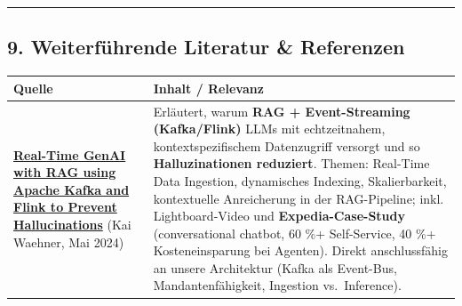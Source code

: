 \begin{center}\rule{0.5\linewidth}{0.5pt}\end{center}

\subsection{9. Weiterführende Literatur \&
Referenzen}\label{weiterfuxfchrende-literatur-referenzen}

{\def\LTcaptype{none} %
\begin{longtable}[]{@{}
  >{\raggedright\arraybackslash}p{}
  >{\raggedright\arraybackslash}p{}@{}}
\toprule\noalign{}
\begin{minipage}[b]{\linewidth}\raggedright
Quelle
\end{minipage} & \begin{minipage}[b]{\linewidth}\raggedright
Inhalt / Relevanz
\end{minipage} \\
\midrule\noalign{}
\endhead
\bottomrule\noalign{}
\endlastfoot
\textbf{\href{https://www.kai-waehner.de/blog/2024/05/30/real-time-genai-with-rag-using-apache-kafka-and-flink-to-prevent-hallucinations/}{Real-Time
GenAI with RAG using Apache Kafka and Flink to Prevent Hallucinations}}
(Kai Waehner, Mai 2024) & Erläutert, warum \textbf{RAG + Event-Streaming
(Kafka/Flink)} LLMs mit echtzeitnahem, kontextspezifischem Datenzugriff
versorgt und so \textbf{Halluzinationen reduziert}. Themen: Real-Time
Data Ingestion, dynamisches Indexing, Skalierbarkeit, kontextuelle
Anreicherung in der RAG-Pipeline; inkl. Lightboard-Video und
\textbf{Expedia-Case-Study} (conversational chatbot, 60 \%+
Self-Service, 40 \%+ Kosteneinsparung bei Agenten). Direkt
anschlussfähig an unsere Architektur (Kafka als Event-Bus,
Mandantenfähigkeit, Ingestion vs.~Inference). \\
\end{longtable}
}
